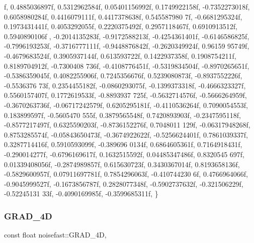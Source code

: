 \begin{DoxyCode}
      f, 0.4885036897f, 0.5312962584f,
    0.05401156992f, 0.1749922158f, -0.7352273018f, 0.6058980284f, 0.4416079111f, 0.4417378638f, 0.545587980
      7f, -0.6681295324f, 0.1973431441f, 0.4053292055f, 0.2220375492f, 0.2957118467f, 0.6910913512f, 0.5940890106f
      , -0.2014135283f, -0.9172588213f,
    -0.4254361401f, -0.6146586825f, -0.7996193253f, -0.3716777111f, -0.9448876842f, -0.2620349924f, 0.96159
      95749f, -0.4679683524f, 0.3905937144f, 0.613593722f, 0.1422937358f, 0.1908754211f, 0.8189704912f, -0.7300408
      736f, -0.4108776451f, -0.5319834504f,
    -0.8970265651f, -0.5386359045f, 0.4082255906f, 0.7245356676f, 0.5239080873f, -0.8937552226f, -0.5536376
      73f, 0.2354455182f, -0.0860293075f, -0.1399373318f, -0.4666323327f, 0.5560157407f, 0.1772619533f, -0.8893937
      725f, -0.5632714576f, -0.5666264959f,
    -0.3670263736f, -0.06717242579f, 0.6205295181f, -0.4110536264f, 0.7090054553f, 0.183899597f, -0.5605470
      555f, 0.3879565548f, 0.7420893903f, -0.2347595118f, -0.8577217497f, 0.6325590203f, -0.8736152276f, 0.7048011
      129f, -0.06317948268f, 0.8753285574f,
    -0.05843650473f, -0.3674922622f, -0.5256624401f, 0.7861039337f, 0.3287714416f, 0.5910593099f, -0.389696
      0134f, 0.6864605361f, 0.7164918431f, -0.290014277f, -0.6796169617f, 0.1632515592f, 0.04485347486f, 0.8320545
      697f, 0.01339408056f, -0.2874989857f,
    0.615630723f, 0.3430367014f, 0.8193658136f, -0.5829600957f, 0.07911697781f, 0.7854296063f, -0.410744230
      6f, 0.4766964066f, -0.9045999527f, -0.1673856787f, 0.2828077348f, -0.5902737632f, -0.321506229f, -0.52245131
      33f, -0.4090169985f, -0.3599685311f,
\}
\end{DoxyCode}
\mbox{\label{classnoisefast_a939f20b593f2e78f9e9e6df0a07e99d0}} 
\subsubsection{\texorpdfstring{G\+R\+A\+D\+\_\+4D}{GRAD\_4D}}
{\footnotesize\ttfamily const float noisefast\+::\+G\+R\+A\+D\+\_\+4D\hspace{0.3cm}{\ttfamily [static]}, {\ttfamily [private]}}

